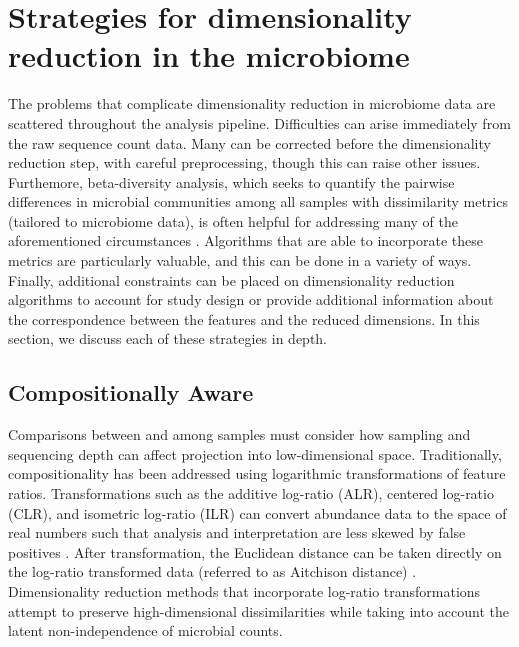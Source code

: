 \section{Strategies for dimensionality reduction in the microbiome}
The problems that complicate dimensionality reduction in microbiome data are scattered throughout the analysis pipeline. Difficulties can arise immediately from the raw sequence count data. Many can be corrected before the dimensionality reduction step, with careful preprocessing, though this can raise other issues. Furthemore, beta-diversity analysis, which seeks to quantify the pairwise differences in microbial communities among all samples with dissimilarity metrics (tailored to microbiome data), is often helpful for addressing many of the aforementioned circumstances \cite{Pielou1966-hn}. Algorithms that are able to incorporate these metrics are particularly valuable, and this can be done in a variety of ways. Finally, additional constraints can be placed on dimensionality reduction algorithms to account for study design or provide additional information about the correspondence between the features and the reduced dimensions. In this section, we discuss each of these strategies in depth. 

\subsection{Compositionally Aware} Comparisons between and among samples must consider how sampling and sequencing depth can affect projection into low-dimensional space. Traditionally, compositionality has been addressed using logarithmic transformations of feature ratios. Transformations such as the additive log-ratio (ALR), centered log-ratio (CLR), and isometric log-ratio (ILR) can convert  abundance data to the space of real numbers such that analysis and interpretation are less skewed by false positives \cite{Pawlowsky-Glahn2011-qk,Aitchison2002-rt}. After transformation, the Euclidean distance can be taken directly on the log-ratio transformed data (referred to as Aitchison distance)  \cite{Aitchison2002-rt}. Dimensionality reduction methods that incorporate log-ratio transformations attempt to preserve high-dimensional dissimilarities while taking into account the latent non-independence of microbial counts.

